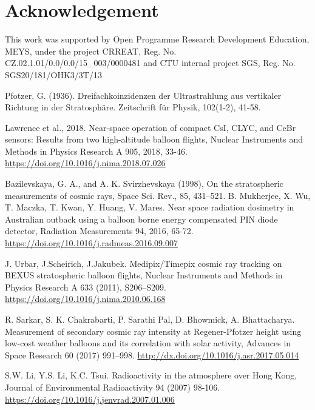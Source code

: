 \documentclass{Rpd}
\begin{document}
\section*{Acknowledgement}

This work was supported by Open Programme Research Development Education, MEYS, under the project CRREAT, \newline Reg. No. CZ.02.1.01/0.0/0.0/15\_003/0000481 and CTU internal project SGS, Reg. No. SGS20/181/OHK3/3T/13

\begin{thebibliography}{99.}%

 Pfotzer, G. (1936). Dreifachkoinzidenzen der Ultrastrahlung aus vertikaler Richtung in der Stratosphäre. Zeitschrift für Physik, 102(1-2), 41-58.

 Lawrence et al., 2018. Near-space operation of compact CsI, CLYC, and CeBr sensors: Results from two high-altitude balloon flights, Nuclear Instruments and Methods in Physics Research A 905, 2018, 33-46. \url{https://doi.org/10.1016/j.nima.2018.07.026}

 Bazilevskaya, G. A., and A. K. Svirzhevskaya (1998), On the stratospheric measurements of cosmic rays, Space Sci. Rev., 85, 431–521.
 B. Mukherjee, X. Wu, T. Maczka, T. Kwan, Y. Huang, V. Mares. Near space radiation dosimetry in Australian outback using a balloon borne energy compensated PIN diode detector, Radiation Measurements 94, 2016, 65-72. \url{https://doi.org/10.1016/j.radmeas.2016.09.007}

 J. Urbar, J.Scheirich, J.Jakubek. Medipix/Timepix cosmic ray tracking on BEXUS stratospheric balloon flights, Nuclear Instruments and Methods in Physics Research A 633 (2011), S206–S209. \url{https://doi.org/10.1016/j.nima.2010.06.168}

 R. Sarkar, S. K. Chakrabarti, P. Sarathi Pal, D. Bhowmick, A. Bhattacharya. Measurement of secondary cosmic ray intensity at Regener-Pfotzer height using low-cost weather balloons and its correlation with solar activity, Advances in Space Research 60 (2017) 991–998. \url{http://dx.doi.org/10.1016/j.asr.2017.05.014}

 S.W. Li, Y.S. Li, K.C. Tsui. Radioactivity in the atmosphere over Hong Kong, Journal of Environmental Radioactivity 94 (2007) 98-106. \url{https://doi.org/10.1016/j.jenvrad.2007.01.006}


\end{thebibliography}
\end{document}
